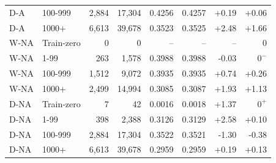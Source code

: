 \begin{table}[htbp]
\begin{tabular}{llrrrrrr}
D-A & 100-999 & 2,884 & 17,304 & 0.4256 & 0.4257 & +0.19 & +0.06\\
D-A & 1000+ & 6,613 & 39,678 & 0.3523 & 0.3525 & +2.48 & +1.66\\
W-NA & Train-zero & 0 & 0 & -- & -- & -- & 0\\
W-NA & 1-99 & 263 & 1,578 & 0.3988 & 0.3988 & -0.03 & $0^{-}$\\
W-NA & 100-999 & 1,512 & 9,072 & 0.3935 & 0.3935 & +0.74 & +0.26\\
W-NA & 1000+ & 2,499 & 14,994 & 0.3085 & 0.3087 & +1.93 & +1.13\\
D-NA & Train-zero & 7 & 42 & 0.0016 & 0.0018 & +1.37 & $0^{+}$\\
D-NA & 1-99 & 398 & 2,388 & 0.3126 & 0.3129 & +2.58 & +0.10\\
D-NA & 100-999 & 2,884 & 17,304 & 0.3522 & 0.3521 & -1.30 & -0.38\\
D-NA & 1000+ & 6,613 & 39,678 & 0.2959 & 0.2959 & +0.19 & +0.13\\
\bottomrule
\end{tabular}
\end{table}
